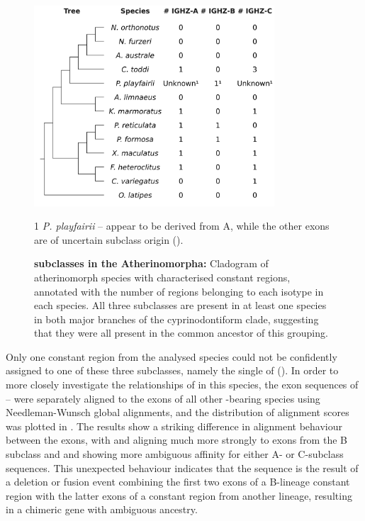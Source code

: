 \begin{figure}
\centering
\includegraphics[width=0.8\textwidth]{_Figures/png/multispecies-cz-subclasses}
\begin{minipage}{0.7\textwidth}
\footnotesize
\begin{threeparttable}
\begin{tablenotes}
\item[1] \textit{P. playfairii}  -- appear to be derived from A, while the other exons are of uncertain subclass origin ().
\end{tablenotes}
\end{threeparttable}
\end{minipage}
\caption[ subclasses in the Atherinomorpha]{\textbf{ subclasses in the Atherinomorpha:} Cladogram of atherinomorph species with characterised  constant regions, annotated with the number of regions belonging to each  isotype in each species. All three subclasses are present in at least one species in both major branches of the cyprinodontiform clade, suggesting that they were all present in the common ancestor of this grouping.}
\label{fig:multispecies-cz-subclasses}
\end{figure}


Only one  constant region from the analysed species could not be confidently assigned to one of these three subclasses, namely the single  of  (). In order to more closely investigate the relationships of  in this species, the exon sequences of  -- were separately aligned to the \cz{} exons of all other -bearing species using Needleman-Wunsch global alignments, and the distribution of alignment scores was plotted in 
. The results show a striking difference in alignment behaviour between the exons, with  and  aligning much more strongly to exons from the B subclass and  and  showing more ambiguous affinity for either A- or C-subclass sequences. This unexpected behaviour indicates that the   sequence is the result of a deletion or fusion event combining the first two exons of a B-lineage  constant region with the latter exons of a constant region from another lineage, resulting in a chimeric gene with ambiguous ancestry.

